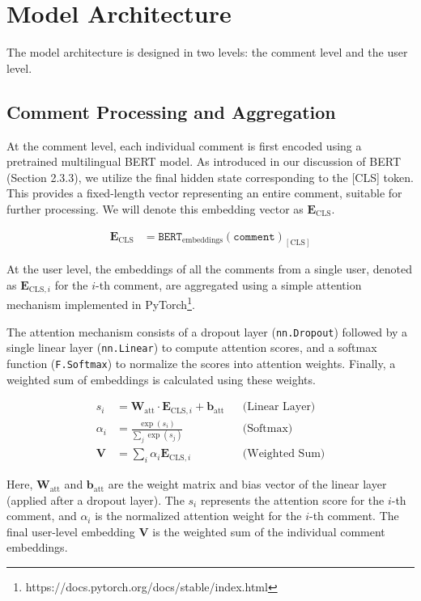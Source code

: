 \documentclass[twoside]{ctuthesis}
\theoremstyle{plain}
\theoremstyle{definition}
\theoremstyle{note}
\begin{document}
\section{Model Architecture}
The model architecture is designed in two levels: the comment level and the user level. 

\subsection{Comment Processing and Aggregation}

At the comment level, each individual comment is first encoded using a pretrained multilingual BERT model. As introduced in our discussion of BERT (Section 2.3.3), we utilize the final hidden state corresponding to the [CLS] token. This provides a fixed-length vector representing an entire comment, suitable for further processing. We will denote this embedding vector as \( \mathbf{E}_{\mathrm{CLS}} \).

\begin{align}
 \mathbf{E}_{\mathrm{CLS}} &= \texttt{BERT}_{\mathrm{embeddings}}(\texttt{comment})_{[\mathrm{CLS}]}
\end{align}

At the user level, the embeddings of all the comments from a single user, denoted as \( \mathbf{E}_{\mathrm{CLS}, i} \) for the \( i \)-th comment, are aggregated using a simple attention mechanism implemented in PyTorch\footnote{https://docs.pytorch.org/docs/stable/index.html}. 

The attention mechanism consists of a dropout layer (\texttt{nn.Dropout}) followed by a single linear layer (\texttt{nn.Linear}) to compute attention scores, and a softmax function (\texttt{F.Softmax}) to normalize the scores into attention weights. Finally, a weighted sum of embeddings is calculated using these weights.

\begin{align}
    s_i &= \mathbf{W}_{\mathrm{att}} \cdot \mathbf{E}_{\mathrm{CLS}, i} + \mathbf{b}_{\mathrm{att}} && \text{(Linear Layer)} \\
    \alpha_i &= \frac{\exp(s_i)}{\sum_{j} \exp(s_j)} && \text{(Softmax)} \\
    \mathbf{V} &= \sum_i \alpha_i \mathbf{E}_{\mathrm{CLS}, i} && \text{(Weighted Sum)}
\end{align}

Here, \( \mathbf{W}_{\mathrm{att}} \) and \( \mathbf{b}_{\mathrm{att}} \) are the weight matrix and bias vector of the linear layer (applied after a dropout layer). The \( s_i \) represents the attention score for the \( i \)-th comment, and \( \alpha_i \) is the normalized attention weight for the \( i \)-th comment. The final user-level embedding \( \mathbf{V} \) is the weighted sum of the individual comment embeddings.
\end{document}
